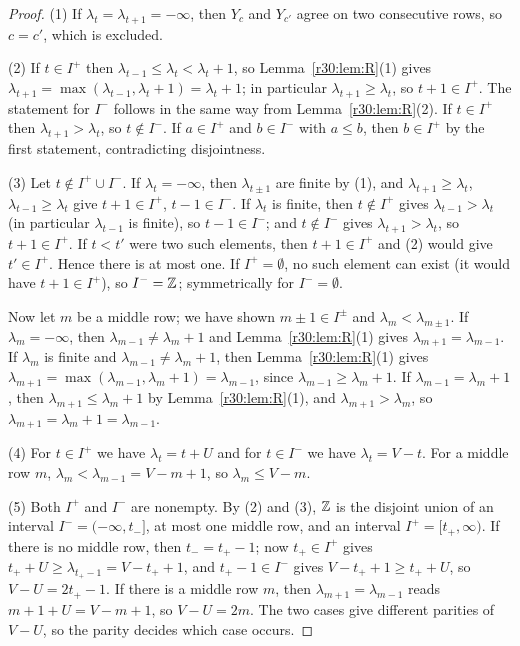 \begin{proof}
(1) If $\lambda_t=\lambda_{t+1}=-\infty$, then $Y_c$ and $Y_{c'}$ agree on two consecutive rows, so $c=c'$, which is excluded.

(2) If $t\in I^+$ then $\lambda_{t-1}\le\lambda_t<\lambda_t+1$, so Lemma~\ref{r30:lem:R}(1) gives $\lambda_{t+1}=\max(\lambda_{t-1},\lambda_t+1)=\lambda_t+1$; in particular $\lambda_{t+1}\ge\lambda_t$, so $t+1\in I^+$. The statement for $I^-$ follows in the same way from Lemma~\ref{r30:lem:R}(2). If $t\in I^+$ then $\lambda_{t+1}>\lambda_t$, so $t\notin I^-$. If $a\in I^+$ and $b\in I^-$ with $a\le b$, then $b\in I^+$ by the first statement, contradicting disjointness.

(3) Let $t\notin I^+\cup I^-$. If $\lambda_t=-\infty$, then $\lambda_{t\pm1}$ are finite by (1), and $\lambda_{t+1}\ge\lambda_t$, $\lambda_{t-1}\ge\lambda_t$ give $t+1\in I^+$, $t-1\in I^-$. If $\lambda_t$ is finite, then $t\notin I^+$ gives $\lambda_{t-1}>\lambda_t$ (in particular $\lambda_{t-1}$ is finite), so $t-1\in I^-$; and $t\notin I^-$ gives $\lambda_{t+1}>\lambda_t$, so $t+1\in I^+$. If $t<t'$ were two such elements, then $t+1\in I^+$ and (2) would give $t'\in I^+$. Hence there is at most one. If $I^+=\emptyset$, no such element can exist (it would have $t+1\in I^+$), so $I^-=\mathbb{Z}$; symmetrically for $I^-=\emptyset$.

Now let $m$ be a middle row; we have shown $m\pm1\in I^\pm$ and $\lambda_m<\lambda_{m\pm1}$. If $\lambda_m=-\infty$, then $\lambda_{m-1}\ne\lambda_m+1$ and Lemma~\ref{r30:lem:R}(1) gives $\lambda_{m+1}=\lambda_{m-1}$. If $\lambda_m$ is finite and $\lambda_{m-1}\ne\lambda_m+1$, then Lemma~\ref{r30:lem:R}(1) gives $\lambda_{m+1}=\max(\lambda_{m-1},\lambda_m+1)=\lambda_{m-1}$, since $\lambda_{m-1}\ge\lambda_m+1$. If $\lambda_{m-1}=\lambda_m+1$, then $\lambda_{m+1}\le\lambda_m+1$ by Lemma~\ref{r30:lem:R}(1), and $\lambda_{m+1}>\lambda_m$, so $\lambda_{m+1}=\lambda_m+1=\lambda_{m-1}$.

(4) For $t\in I^+$ we have $\lambda_t=t+U$ and for $t\in I^-$ we have $\lambda_t=V-t$. For a middle row $m$, $\lambda_m<\lambda_{m-1}=V-m+1$, so $\lambda_m\le V-m$.

(5) Both $I^+$ and $I^-$ are nonempty. By (2) and (3), $\mathbb{Z}$ is the disjoint union of an interval $I^-=(-\infty,t_-]$, at most one middle row, and an interval $I^+=[t_+,\infty)$. If there is no middle row, then $t_-=t_+-1$; now $t_+\in I^+$ gives $t_++U\ge\lambda_{t_+-1}=V-t_++1$, and $t_+-1\in I^-$ gives $V-t_++1\ge t_++U$, so $V-U=2t_+-1$. If there is a middle row $m$, then $\lambda_{m+1}=\lambda_{m-1}$ reads $m+1+U=V-m+1$, so $V-U=2m$. The two cases give different parities of $V-U$, so the parity decides which case occurs.


\end{proof}
